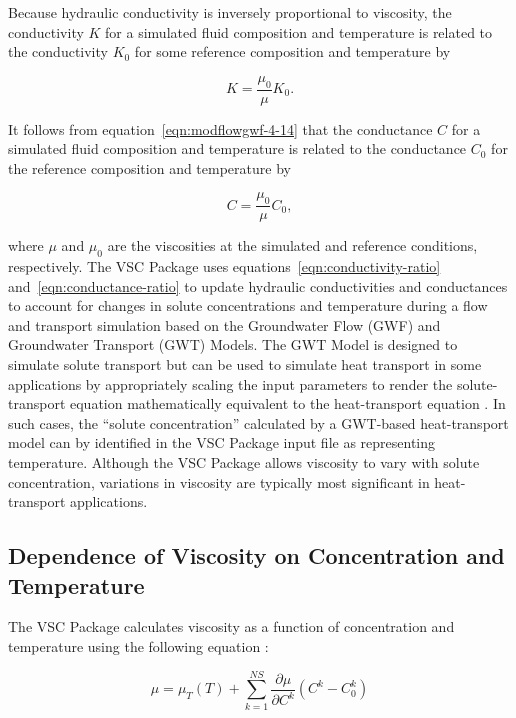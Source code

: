 Because hydraulic conductivity is inversely proportional to viscosity, the conductivity $K$ for a simulated fluid composition and temperature is related to the conductivity $K_{0}$ for some reference composition and temperature by

\begin{equation}
\label{eqn:conductivity-ratio}
K = \frac{\mu_{0}}{\mu} K_{0}.
\end{equation}

\noindent It follows from equation~\ref{eqn:modflowgwf-4-14} that the conductance $C$ for a simulated fluid composition and temperature is related to the conductance $C_{0}$ for the reference composition and temperature by

\begin{equation}
\label{eqn:conductance-ratio}
C = \frac{\mu_{0}}{\mu} C_{0},
\end{equation}

\noindent where $\mu$ and $\mu_{0}$ are the viscosities at the simulated and reference conditions, respectively. The VSC Package uses equations~\ref{eqn:conductivity-ratio} and~\ref{eqn:conductance-ratio} to update hydraulic conductivities and conductances to account for changes in solute concentrations and temperature during a flow and transport simulation based on the Groundwater Flow (GWF) and Groundwater Transport (GWT) Models. The GWT Model is designed to simulate solute transport but can be used to simulate heat transport in some applications by appropriately scaling the input parameters to render the solute-transport equation mathematically equivalent to the heat-transport equation \citep{zheng2010supplemental}. In such cases, the ``solute concentration'' calculated by a GWT-based heat-transport model can by identified in the VSC Package input file as representing temperature. Although the VSC Package allows viscosity to vary with solute concentration, variations in viscosity are typically most significant in heat-transport applications.

\subsection{Dependence of Viscosity on Concentration and Temperature} \label{sec:fluidvsc}

The VSC Package calculates viscosity as a function of concentration and temperature using the following equation \citep[equation 17]{langevin2008seawat}:

\begin{equation}
\label{eqn:viscfunc}
\mu = \mu_T \left ( T \right ) + \sum_{k=1}^{NS} \frac{\partial \mu} {\partial C^k} \left ( C^k - C_{0}^k \right ) 
\end{equation}

